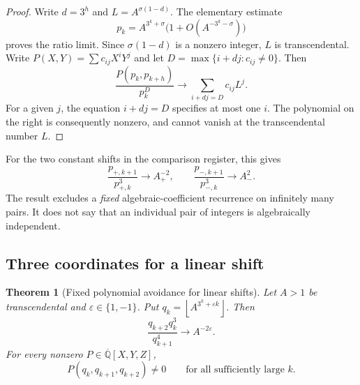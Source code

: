 \documentclass[11pt,a4paper]{article}
\numberwithin{equation}{section}
\newtheorem{theorem}{Theorem}[section]
\theoremstyle{definition}
\theoremstyle{remark}
\newcommand{\A}{\overline{\mathbb Q}}
\newcommand{\floor}[1]{\left\lfloor #1\right\rfloor}
\begin{document}
\begin{proof}
Write \(d=3^h\) and
\(L=A^{\sigma(1-d)}\). The elementary estimate
\[
 p_k=A^{3^k+\sigma}\bigl(1+O(A^{-3^k-\sigma})\bigr)
\]
proves the ratio limit. Since \(\sigma(1-d)\) is a nonzero integer,
\(L\) is transcendental. Write
\(P(X,Y)=\sum c_{ij}X^iY^j\) and let
\(D=\max\{i+dj:c_{ij}\ne0\}\). Then
\[
 \frac{P(p_k,p_{k+h})}{p_k^D}
 \longrightarrow \sum_{i+dj=D}c_{ij}L^j.
\]
For a given \(j\), the equation \(i+dj=D\) specifies at most one
\(i\). The polynomial on the right is consequently nonzero, and
cannot vanish at the transcendental number \(L\).
\end{proof}

For the two constant shifts in the comparison register, this gives
\[
 \frac{p_{+,k+1}}{p_{+,k}^3}\longrightarrow A_+^{-2},
 \qquad
 \frac{p_{-,k+1}}{p_{-,k}^3}\longrightarrow A_-^{2}.
\]
The result excludes a \emph{fixed} algebraic-coefficient recurrence
on infinitely many pairs. It does not say that an individual pair
of integers is algebraically independent.

\subsection{Three coordinates for a linear shift}
\label{mi:three}

\begin{theorem}[Fixed polynomial avoidance for linear shifts]
\label{mi:linear}
Let \(A>1\) be transcendental and \(\varepsilon\in\{1,-1\}\).
Put \(q_k=\floor{A^{3^k+\varepsilon k}}\). Then
\[
 \frac{q_{k+2}q_k^3}{q_{k+1}^4}
 \longrightarrow A^{-2\varepsilon}.
\]
For every nonzero \(P\in\A[X,Y,Z]\),
\[
 P(q_k,q_{k+1},q_{k+2})\ne0
 \qquad\text{for all sufficiently large }k.
\]
\end{theorem}
\end{document}
